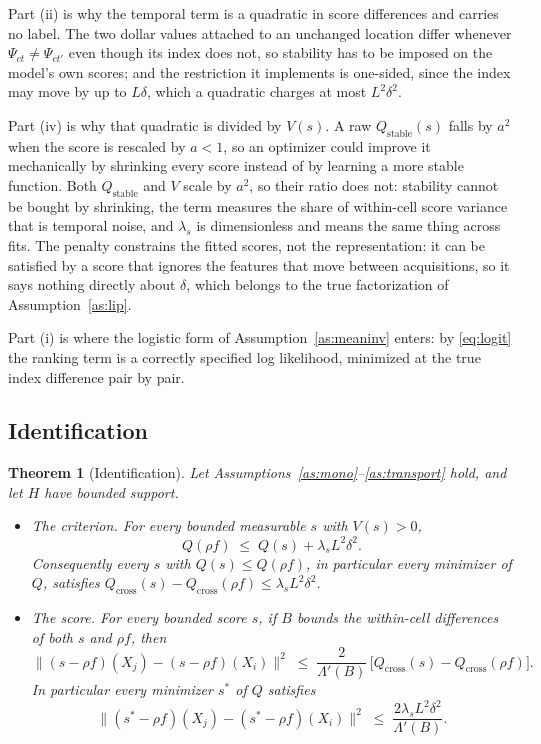 \documentclass[11pt]{article}
\newtheorem{theorem}{Theorem}
\theoremstyle{remark}
\newcommand{\Qc}{Q_{\mathrm{cross}}}
\newcommand{\Qs}{Q_{\mathrm{stable}}}
\newcommand{\Qt}{Q}
\begin{document}
Part (ii) is why the temporal term is a quadratic in score differences and carries no label. The two
dollar values attached to an unchanged location differ whenever $\Psi_{ct}\ne\Psi_{ct'}$ even though its
index does not, so stability has to be imposed on the model's own scores; and the restriction it
implements is one-sided, since the index may move by up to $L\delta$, which a quadratic charges at most
$L^{2}\delta^{2}$.

Part (iv) is why that quadratic is divided by $V(s)$. A raw $\Qs(s)$ falls by $a^{2}$ when the score is
rescaled by $a<1$, so an optimizer could improve it mechanically by shrinking every score instead of by
learning a more stable function. Both $\Qs$ and $V$ scale by $a^{2}$, so their ratio does not: stability
cannot be bought by shrinking, the term measures the share of within-cell score variance that is
temporal noise, and $\lambda_{s}$ is dimensionless and means the same thing across fits. The penalty
constrains the fitted scores, not the representation: it can be satisfied by a score that ignores the
features that move between acquisitions, so it says nothing directly about $\delta$, which belongs to
the true factorization of Assumption~\ref{as:lip}.

Part (i) is where the logistic form of Assumption~\ref{as:meaninv} enters: by \eqref{eq:logit} the
ranking term is a correctly specified log likelihood, minimized at the true index difference pair by
pair.

\subsection{Identification}\label{sec:approx}

\begin{theorem}[Identification]\label{thm:approx}
Let Assumptions~\ref{as:mono}--\ref{as:transport} hold, and let $H$ have bounded support.
\begin{itemize}
\item[\textbf{(i)}] \emph{The criterion.} For every bounded measurable $s$ with $V(s)>0$,
\[
    \Qt(\rho f) \;\le\; \Qt(s) + \lambda_{s}L^{2}\delta^{2}.
\]
Consequently every $s$ with $\Qt(s) \le \Qt(\rho f)$, in particular every minimizer of $\Qt$, satisfies
$\Qc(s) - \Qc(\rho f) \le \lambda_{s}L^{2}\delta^{2}$.
\item[\textbf{(ii)}] \emph{The score.} For every bounded score $s$, if $B$ bounds the within-cell
differences of both $s$ and $\rho f$, then
\[
    \big\|(s-\rho f)(X_j)-(s-\rho f)(X_i)\big\|^{2} \;\le\; \frac{2}{\Lambda'(B)}\,\big[\Qc(s) - \Qc(\rho f)\big].
\]
In particular every minimizer $s^{*}$ of $\Qt$ satisfies
\[
    \big\|(s^{*}-\rho f)(X_j)-(s^{*}-\rho f)(X_i)\big\|^{2} \;\le\; \frac{2\lambda_{s}L^{2}\delta^{2}}{\Lambda'(B)}.
\]
\end{itemize}
\end{theorem}
\end{document}
